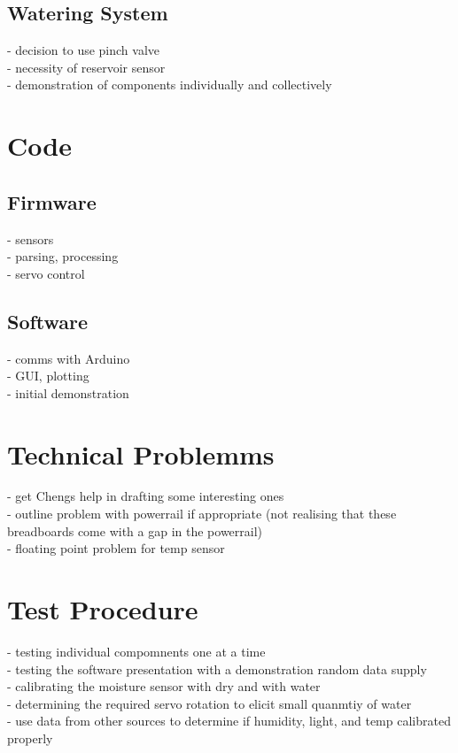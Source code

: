 \documentclass[a4paper,11pt]{article}
\begin{document}
\subsection{Watering System}
\label{sec:Watering_System}

- decision to use pinch valve\\
- necessity of reservoir sensor\\ 
- demonstration of components individually and collectively

\section{Code}
\label{sec:Code}
\subsection{Firmware}
\label{sec:Firmware}
- sensors\\
- parsing, processing\\
- servo control

\subsection{Software}
\label{sec:Software}
- comms with Arduino\\
- GUI, plotting\\
- initial demonstration

\section{Technical Problemms}
\label{sec:Technical_Problems}
- get Chengs help in drafting some interesting ones \\
- outline problem with powerrail if appropriate (not realising that these breadboards come with a gap in the powerrail)\\
- floating point problem for temp sensor

\section{Test Procedure}
\label{sec:Test_Procedure}
- testing individual compomnents one at a time \\
- testing the software presentation with a demonstration random data supply\\
- calibrating the moisture sensor with dry and with water\\
- determining the required servo rotation to elicit small quanmtiy of water\\
- use data from other sources to determine if humidity, light, and temp calibrated properly
\end{document}
